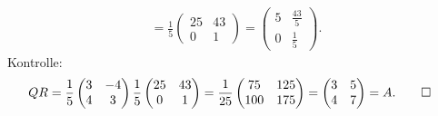 \begin{loesung}
\begin{align*}
=\frac15\begin{pmatrix}
25&43\\
 0&1
\end{pmatrix}
=\begin{pmatrix}
5&\frac{43}{5}\\
0&\frac{1}{5}
\end{pmatrix}.
\end{align*}
Kontrolle:
\begin{align*}
QR&=\frac15\begin{pmatrix}3&-4\\4&3\end{pmatrix}\frac15\begin{pmatrix}25&43\\0&1\end{pmatrix}
=\frac1{25}\begin{pmatrix}75&125\\100&175\end{pmatrix}
=\begin{pmatrix}3&5\\4&7\end{pmatrix}=A.
\qedhere
\end{align*}
\end{loesung}
